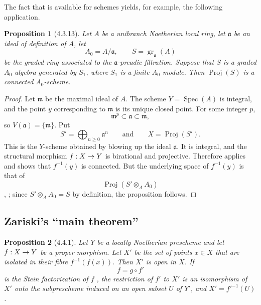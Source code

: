 \documentclass[oneside]{amsart}
\theoremstyle{ega-env-style}
\theoremstyle{ega-thm-env-style}
\newtheorem*{proposition}{Proposition}
\theoremstyle{ega-defn-env-style}
\def\geq{\geqslant}                 %
\def\Proj{\operatorname{Proj}}
\def\Spec{\operatorname{Spec}}
\renewcommand{\to}{\mathchoice{\longrightarrow}{\rightarrow}{\rightarrow}{\rightarrow}}
\let\EGAOriginalLabel\label
\renewcommand{\label}[1]{\phantomsection\EGAOriginalLabel{#1}}
\begin{document}
The fact that  is available for schemes yields, for
example, the following application.

\begin{proposition}[4.3.13]
\label{III.4.3.13}
Let $A$ be a unibranch Noetherian local ring, let $\mathfrak{a}$ be
an ideal of definition of $A$, let
\[
  A_0=A/\mathfrak{a},
  \qquad
  S=\operatorname{gr}_{\mathfrak{a}}(A)
\]
be the graded ring associated to the $\mathfrak{a}$-preadic
filtration.  Suppose that $S$ is a graded $A_0$-algebra generated by
$S_1$, where $S_1$ is a finite $A_0$-module.  Then $\Proj(S)$ is a
connected $A_0$-scheme.
\end{proposition}

\begin{proof}
Let $\mathfrak{m}$ be the maximal ideal of $A$.  The scheme
$Y=\Spec(A)$ is integral, and the point $y$ corresponding to
$\mathfrak{m}$ is its unique closed point.  For some integer $p$,
\[
  \mathfrak{m}^p\subset\mathfrak{a}\subset\mathfrak{m},
\]
so $V(\mathfrak{a})=\{\mathfrak{m}\}$.  Put
\[
  S'=\bigoplus_{n\geq0}\mathfrak{a}^n
  \qquad\text{and}\qquad
  X=\Proj(S').
\]
This is the $Y$-scheme obtained by blowing up the ideal
$\mathfrak{a}$.  It is integral, and the structural morphism
$f:X\to Y$ is birational  and projective.
Therefore  applies and shows that $f^{-1}(y)$ is
connected.  But the underlying space of $f^{-1}(y)$ is that of
\[
  \Proj(S'\otimes_A A_0)
\]
, ; since
$S'\otimes_AA_0=S$ by definition, the proposition follows.
\end{proof}


\subsection{Zariski's ``main theorem''}
\label{subsection:III.4.4}

\begin{proposition}[4.4.1]
\label{III.4.4.1}
Let $Y$ be a locally Noetherian prescheme and let $f:X\to Y$ be a
proper morphism.  Let $X'$ be the set of points $x\in X$ that are
isolated in their fibre $f^{-1}(f(x))$.  Then $X'$ is open in $X$.
If
\[
  f=g\circ f'
\]
is the Stein factorization of $f$ , the restriction
of $f'$ to $X'$ is an isomorphism of $X'$ onto the subprescheme
induced on an open subset $U$ of $Y'$, and
$X'=f'^{-1}(U)$.
\end{proposition}
\end{document}
